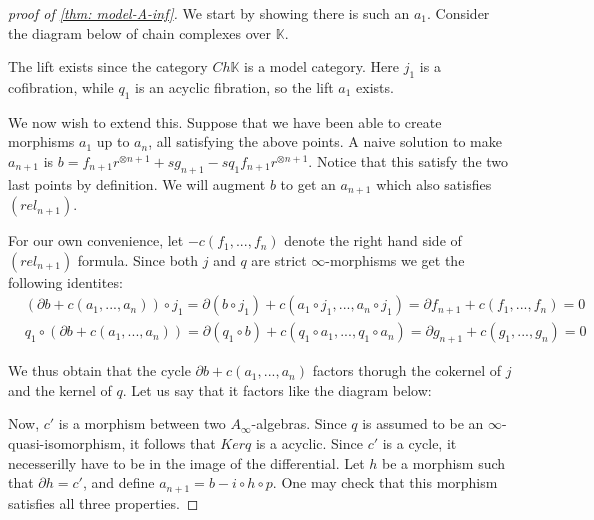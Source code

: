 \documentclass[../thesis.tex]{subfiles}
\begin{document}
\begin{proof}[proof of \ref{thm: model-A-inf}]
            We start by showing there is such an $a_1$. Consider the diagram below of chain complexes over $\mathbb{K}$.
            \begin{center}
            \end{center}
            The lift exists since the category $Ch\mathbb{K}$ is a model category. Here $j_1$ is a cofibration, while $q_1$ is an acyclic fibration, so the lift $a_1$ exists.

            We now wish to extend this. Suppose that we have been able to create morphisms $a_1$ up to $a_n$, all satisfying the above points. A naive solution to make $a_{n+1}$ is $b = f_{n+1}r^{\otimes n+1} + sg_{n+1} - s q_1f_{n+1}r^{\otimes n+1}$. Notice that this satisfy the two last points by definition. We will augment $b$ to get an $a_{n+1}$ which also satisfies $(rel_{n+1})$.

            For our own convenience, let $-c(f_1, ..., f_n)$ denote the right hand side of $(rel_{n+1})$ formula. Since both $j$ and $q$ are strict $\infty$-morphisms we get the following identites:
            \begin{align*}
                & (\partial b + c(a_1, ..., a_n)) \circ j_1 = \partial (b\circ j_1) + c(a_1 \circ j_1, ..., a_n \circ j_1) = \partial f_{n+1} + c(f_1, ..., f_n) = 0 \\
                & q_1 \circ (\partial b + c(a_1, ..., a_n)) = \partial (q_1\circ b) + c(q_1\circ a_1, ..., q_1\circ a_n) = \partial {g_{n+1}} + c(g_1, ..., g_n) = 0
            \end{align*}

            We thus obtain that the cycle $\partial b + c(a_1, ..., a_n)$ factors thorugh the cokernel of $j$ and the kernel of $q$. Let us say that it factors like the diagram below:
            \begin{center}
            \end{center}

            Now, $c'$ is a morphism between two $A_\infty$-algebras. Since $q$ is assumed to be an $\infty$-quasi-isomorphism, it follows that $Kerq$ is a acyclic. Since $c'$ is a cycle, it necesserilly have to be in the image of the differential. Let $h$ be a morphism such that $\partial h = c'$, and define $a_{n+1} = b - i\circ h\circ p$. One may check that this morphism satisfies all three properties.


\end{proof}
\end{document}
